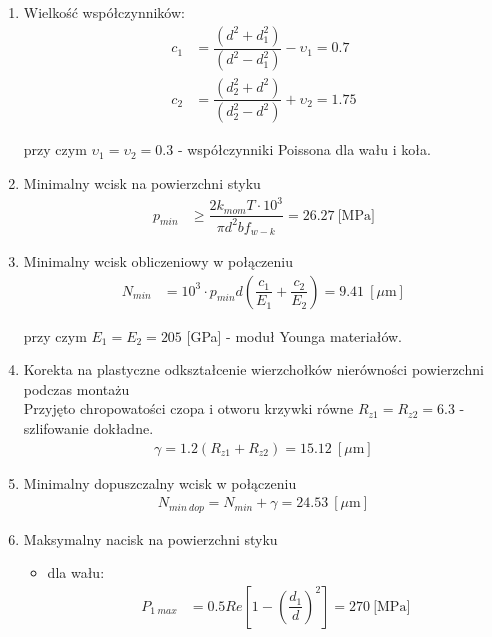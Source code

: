 		\begin{enumerate}
			\item Wielkość współczynników:
				\begin{align}
					c_1 &= \dfrac{(d^2 +d_1^2)}{(d^2 - d_1^2)} - \upsilon_1 = 0.7 \\[2em]	
					c_2 &= \dfrac{(d_2^2 +d^2)}{(d_2^2 - d^2)} + \upsilon_2 = 1.75
				\end{align}
				
				przy czym $\upsilon_1 = \upsilon_2 = 0.3$ - współczynniki Poissona dla wału i koła.
				
			\item Minimalny wcisk na powierzchni styku
				\begin{align}
					p_{min} &\geq \dfrac{2 k_{mom} T \cdot 10^3}{\pi d^2 b f_{w-k}} = 26.27 \ \text{[MPa]} 
				\end{align}
			
			\item Minimalny wcisk obliczeniowy w połączeniu
				\begin{align}
					N_{min} &= 10^3 \cdot p_{min} d \left(\dfrac{c_1}{E_1} + \dfrac{c_2}{E_2}\right) = 9.41 \ [\mu \text{m}] 
				\end{align}
			
				przy czym $E_1 = E_2 = 205$ [GPa] - moduł Younga materiałów.
				
			\item Korekta na plastyczne odkształcenie wierzchołków nierówności powierzchni podczas montażu \\
			Przyjęto chropowatości czopa i otworu krzywki równe $R_{z1} = R_{z2} = 6.3$ - szlifowanie dokładne.
				\begin{align}
					\gamma = 1.2 (R_{z1} + R_{z2}) = 15.12 \ [\mu \text{m}]
				\end{align}
			
			\item Minimalny dopuszczalny wcisk w połączeniu
				\begin{align}
					N_{min \ dop} = N_{min} + \gamma = 24.53 \ [\mu \text{m}] 
				\end{align}
			
			
			\item Maksymalny nacisk na powierzchni styku
			\begin{itemize}
				\item dla wału:
				\begin{align}
				P_{1 \ max} &= 0.5 Re \left[1 - \left(\dfrac{d_1}{d}\right)^2\right] = 270 \ \text{[MPa]}
				\end{align}
				

\end{itemize}
\end{enumerate}
